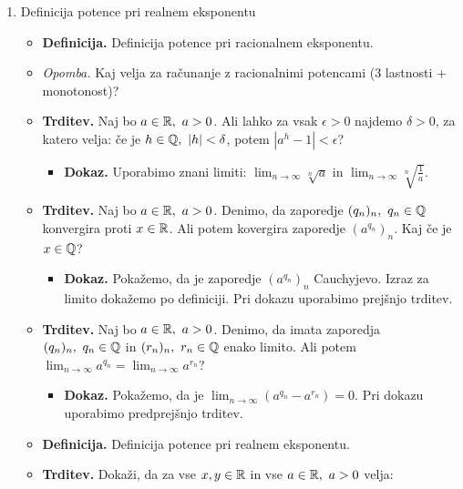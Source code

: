 \begin{enumerate}
    \item Definicija potence pri realnem eksponentu
    \begin{itemize}
        \item \colorbox{purple!30}{\textbf{Definicija.}} Definicija potence pri racionalnem eksponentu.
        \item \colorbox{yellow!30}{\emph{Opomba.}} Kaj velja za računanje z racionalnimi potencami (3 lastnosti + monotonost)?
        \item \colorbox{blue!30}{\textbf{Trditev.}}  Naj bo $a \in \mathbb{R}, \ a>0$. Ali lahko za vsak $\epsilon > 0$ najdemo $\delta>0$, za katero velja: če je $h \in \mathbb{Q}, \ |h| < \delta$, potem $|a^h - 1| < \epsilon$?
        \begin{itemize}
            \item \colorbox{green!30}{\textbf{Dokaz.}} Uporabimo znani limiti: $\lim_{n \to \infty} \sqrt[n]{a}$ in $\lim_{n \to \infty} \sqrt[n]{\frac{1}{a}}$.
        \end{itemize} 
        \item \colorbox{blue!30}{\textbf{Trditev.}}  Naj bo $a \in \mathbb{R}, \ a>0$. Denimo, da zaporedje $(q_n)_n, \ q_n \in \mathbb{Q}$ konvergira proti $x \in \mathbb{R}$. Ali potem kovergira zaporedje $(a^{q_n})_n$. Kaj če je $x \in \mathbb{Q}$?
        \begin{itemize}
            \item \colorbox{green!30}{\textbf{Dokaz.}} Pokažemo, da je zaporedje $(a^{q_n})_n$ Cauchyjevo. Izraz za limito dokažemo po definiciji. Pri dokazu uporabimo prejšnjo trditev.
        \end{itemize} 
        \item \colorbox{blue!30}{\textbf{Trditev.}}  Naj bo $a \in \mathbb{R}, \ a>0$. Denimo, da imata zaporedja $(q_n)_n, \ q_n \in \mathbb{Q}$ in $(r_n)_n, \ r_n \in \mathbb{Q}$ enako limito. Ali potem $\lim_{n \to \infty} a^{q_n} = \lim_{n \to \infty} a^{r_n}$?
        \begin{itemize}
            \item \colorbox{green!30}{\textbf{Dokaz.}} Pokažemo, da je $\lim_{n \to \infty} (a^{q_n} - a^{r_n}) = 0$. Pri dokazu uporabimo predprejšnjo trditev.
        \end{itemize} 
        \item \colorbox{purple!30}{\textbf{Definicija.}} Definicija potence pri realnem eksponentu.
        \item \colorbox{blue!30}{\textbf{Trditev.}}  Dokaži, da za vse $x, y \in \mathbb{R}$ in vse $a \in \mathbb{R}, \ a>0$ velja: 
        

\end{itemize}
\end{enumerate}
